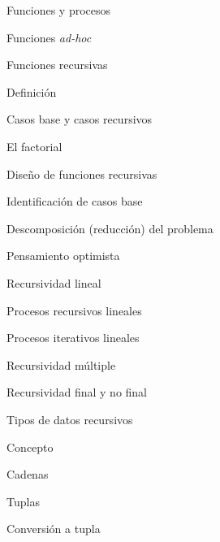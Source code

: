 \begin{longenum}
\begin{longenum}
\begin{longenum}
            \item Funciones y procesos
            \begin{longenum}
                \item Funciones \textit{ad-hoc}
            \end{longenum}
            \item Funciones recursivas
            \begin{longenum}
                \item Definición
                \item Casos base y casos recursivos
                \item El factorial
                \item Diseño de funciones recursivas
                \begin{longenum}
                    \item Identificación de casos base
                    \item Descomposición (reducción) del problema
                    \item Pensamiento optimista
                \end{longenum}
                \item Recursividad lineal
                \begin{longenum}
                    \item Procesos recursivos lineales \opcional\
                    \item Procesos iterativos lineales \opcional\
                \end{longenum}
                \item Recursividad múltiple
                \item Recursividad final y no final \opcional\
            \end{longenum}
            \item Tipos de datos recursivos
            \begin{longenum}
                \item Concepto
                \item Cadenas
                \item Tuplas
                \begin{longenum}
                    \item Conversión a tupla
                \end{longenum}
            \end{longenum}
        \end{longenum}

\end{longenum}
\end{longenum}
